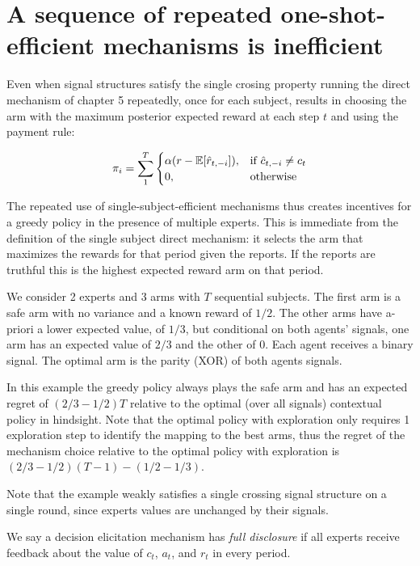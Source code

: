 \section{A sequence of repeated one-shot-efficient mechanisms is inefficient}

Even when signal structures satisfy the single crosing property running the direct mechanism of chapter 5 repeatedly, once for each subject, results in choosing the arm with the maximum posterior expected reward at each step $t$ and using the payment rule:

\[
    \pi_i = \sum_1^T 
\begin{cases}
    \alpha (r - \expec[\hat{r}_{t,-i}]) ,& \text{if } \hat{c}_{t,-i} \neq c_t\\
    0,              & \text{otherwise}
\end{cases}
\]

The repeated use of single-subject-efficient mechanisms thus creates incentives for a greedy policy in the presence of multiple experts.
This is immediate from the definition of the single subject direct mechanism: it selects the arm that maximizes the rewards for that period given the reports. If the reports are truthful this is the highest expected reward arm on that period.


\begin{eg}\label{eg:2regimes}
We consider 2 experts and 3 arms with $T$ sequential subjects. The first arm is a safe arm with no variance and a known reward of $1/2$. The other arms have a-priori a lower expected value, of $1/3$, but conditional on both agents' signals, one arm has an expected value of $2/3$ and the other of $0$. 
Each agent receives a binary signal. The optimal arm is the parity (XOR) of both agents signals. 
\end{eg}

In this example the greedy policy always plays the safe arm and has an expected regret of $(2/3 - 1/2)T$ relative to the optimal (over all signals) contextual policy in hindsight.
Note that the optimal policy with exploration only requires 1 exploration step to identify the mapping to the best arms, thus the regret of the mechanism choice  relative to the optimal policy with exploration is $(2/3 - 1/2)(T-1) - (1/2-1/3)$. 

Note that the example weakly satisfies a single crossing signal structure on a single round, since experts values are unchanged by their signals.

\begin{defn}
  We say a decision elicitation mechanism has \emph{full disclosure} if all experts receive feedback about the value of $c_t$, $a_t$, and $r_t$ in every period.
 \end{defn}


